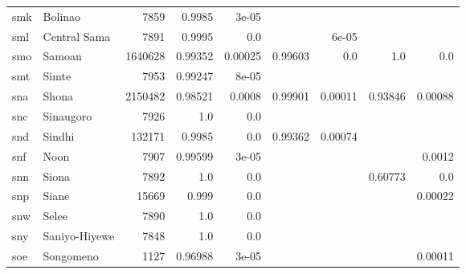 \documentclass[11pt]{article}
\begin{document}
\begin{table*}[h]
{\begin{tabular}{llrrrrrrr}
smk         & Bolinao         & 7859         & 0.9985         & 3e-05         &          &          &          &          \\

sml         & Central Sama         & 7891         & 0.9995         & 0.0         &          & 6e-05         &          &          \\

smo         & Samoan         & 1640628         & 0.99352         & 0.00025         & 0.99603         & 0.0         & 1.0         & 0.0         \\

smt         & Simte         & 7953         & 0.99247         & 8e-05         &          &          &          &          \\

sna         & Shona         & 2150482         & 0.98521         & 0.0008         & 0.99901         & 0.00011         & 0.93846         & 0.00088         \\

snc         & Sinaugoro         & 7926         & 1.0         & 0.0         &          &          &          &          \\

snd         & Sindhi         & 132171         & 0.9985         & 0.0         & 0.99362         & 0.00074         &          &          \\

snf         & Noon         & 7907         & 0.99599         & 3e-05         &          &          &          & 0.0012         \\

snn         & Siona         & 7892         & 1.0         & 0.0         &          &          & 0.60773         & 0.0         \\

snp         & Siane         & 15669         & 0.999         & 0.0         &          &          &          & 0.00022         \\

snw         & Selee         & 7890         & 1.0         & 0.0         &          &          &          &          \\

sny         & Saniyo-Hiyewe         & 7848         & 1.0         & 0.0         &          &          &          &          \\

soe         & Songomeno         & 1127         & 0.96988         & 3e-05         &          &          &          & 0.00011         \\


\end{tabular}}
\end{table*}
\end{document}
